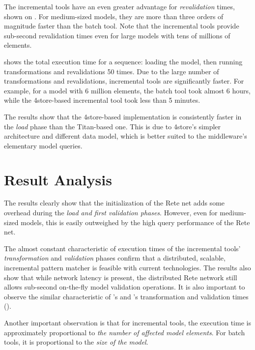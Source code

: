The incremental tools have an even greater advantage for \emph{revalidation} times, shown on . For medium-sized models, they are more than three orders of magnitude faster than the batch tool. Note that the incremental tools provide sub-second revalidation times even for large models with tens of millions of elements.


 shows the total execution time for a sequence: loading the model, then running transformations and revalidations 50 times. Due to the large number of transformations and revalidations, incremental tools are significantly faster. For example, for a model with 6 million elements, the batch tool took almost 6 hours, while the 4store-based incremental tool took less than 5 minutes. 

The results show that the 4store-based \iqd{} implementation is consistently faster in the \emph{load} phase than the Titan-based one. This is due to 4store's simpler architecture and different data model, which is better suited to the \iqd{} middleware's elementary model queries.

\section{Result Analysis}

The results clearly show that the initialization of the Rete net adds some overhead during the \emph{load and first validation phases}. However, even for medium-sized models, this is easily outweighed by the high query performance of the Rete net.

The almost constant characteristic of execution times of the incremental tools' \emph{transformation} and \emph{validation} phases confirm that a distributed, scalable, incremental pattern matcher is feasible with current technologies. The results also show that while network latency is present, the distributed Rete network still allows sub-second on-the-fly model validation operations. It is also important to observe the similar characteristic of \iqd{}'s and \eiq{}'s transformation and validation times ().

Another important observation is that for incremental tools, the execution time is approximately proportional to \emph{the number of affected model elements}. For batch tools, it is proportional to the \emph{size of the model}. 

